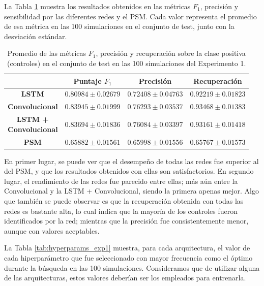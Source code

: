 \documentclass[../../main.tex]{subfiles}
\begin{document}
La Tabla \ref{tab:results_exp1} muestra los resultados obtenidos en las métricas \(F_1\),
precisión y sensibilidad por las diferentes redes y el PSM. Cada valor representa el
promedio de esa métrica en las 100 simulaciones en el conjunto de test, junto con la
desviación estándar.

\begin{table}[H]
    \centering
    \renewcommand{\arraystretch}{1.2}
    \begin{tabular}{|c|c|c|c|}
        \hline
         & \textbf{Puntaje} \(F_1\) & \textbf{Precisión} & \textbf{Recuperación} \\ \hline\hline
        \textbf{LSTM}
            & $0.80984 \pm 0.02679$ & $0.72408 \pm 0.04763$ & $0.92219 \pm 0.01823$ \\ \hline
        \textbf{Convolucional}
            & $\mathbf{0.83945 \pm 0.01999}$ & $\mathbf{0.76293 \pm 0.03537}$ & $\mathbf{0.93468 \pm 0.01383}$ \\ \hline
        \makecell{\textbf{LSTM +}\\\textbf{Convolucional}}
            & $0.83694 \pm 0.01836$ & $0.76084 \pm 0.03397$ & $0.93161 \pm 0.01418$ \\ \hline
        \textbf{PSM}
            & $0.65882 \pm 0.01561$ & $0.65998 \pm 0.01556$ & $0.65767 \pm 0.01573$ \\
        \hline
    \end{tabular}

    \caption{Promedio de las métricas \(F_1\), precisión y recuperación sobre la
    clase positiva (controles) en el conjunto de test en las 100 simulaciones del
    Experimento 1.}
    \label{tab:results_exp1}
\end{table}

En primer lugar, se puede ver que el desempeño de todas las redes fue superior al del PSM,
y que los resultados obtenidos con ellas son satisfactorios. En segundo lugar, el
rendimiento de las redes fue parecido entre ellas; más aún entre la Convolucional y la
LSTM + Convolucional, siendo la primera apenas mejor. Algo que también se puede observar
es que la recuperación obtenida con todas las redes es bastante alta, lo cual indica que
la mayoría de los controles fueron identificados por la red; mientras que la precisión fue
consistentemente menor, aunque con valores aceptables.

La Tabla \ref{tab:hyperparams_exp1} muestra, para cada arquitectura, el valor de cada
hiperparámetro que fue seleccionado con mayor frecuencia como el óptimo durante la
búsqueda en las 100 simulaciones. Consideramos que de utilizar alguna de las
arquitecturas, estos valores deberían ser los empleados para entrenarla.
\end{document}
